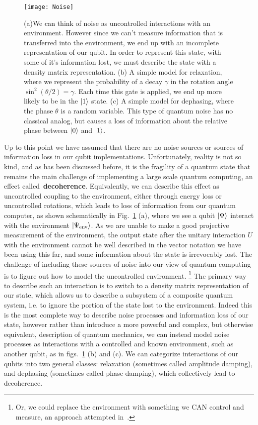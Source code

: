 \begin{figure}
  \texttt{[image: Noise]}
  \caption[Noise affecting pure states]
  {(a)We can think of noise as uncontrolled interactions with an environment. However since we can't measure
  information that is transferred into the environment, we end up with an incomplete representation of our qubit.
  In order to represent this state, with some of it's information lost, we must describe the state with a density
  matrix representation. (b) A simple model for relaxation, where we represent the probability of a decay $\gamma$
  in the rotation angle $\sin^2(\theta/2) = \gamma$. Each time this gate is applied, we end up more likely to be in
  the $\ket{1}$ state. (c) A simple model for dephasing, where the phase $\theta$ is a random variable. This type
  of quantum noise has no classical analog, but causes a loss of information about the relative phase between $\ket{0}$
  and $\ket{1}$.}
  \label{fig:noise}
\end{figure}

Up to this point we have assumed that there are no noise sources or sources of information loss in our
qubit implementations. Unfortunately, reality is not so kind, and as has been discussed before, it is the
fragility of a quantum state that remains the main challenge of implementing a large scale quantum computing,
an effect called~\textbf{decoherence}. Equivalently, we can describe this effect as uncontrolled coupling to the environment, either through
energy loss or uncontrolled rotations, which leads to loss of information from our quantum computer, as shown schematically
in Fig.~\ref{fig:noise} (a), where we see a qubit $\ket{\Psi}$ interact with the environment $\ket{\Psi_{\textrm{env}}}$.
As we are unable to make a good projective measurement of the environment, the output
state after the unitary interaction $U$ with the environment cannot be well described in the vector notation we have been using
this far, and some information about the state is irrevocably lost. The challenge of including
these sources of noise into our view of quantum computing is to figure out how to model the uncontrolled environment.
\footnote{Or, we could replace the environment with something we CAN control and measure, an approach attempted
in~\cite{2018arXiv180300545M}.}
The primary way to describe such an interaction is to switch to a density matrix representation of our state, which allows us
to describe a subsystem of a composite quantum system, i.e. to ignore the portion of the state lost to the environment.
Indeed this is the most complete way to describe noise processes and information loss of our state, however rather
than introduce a more powerful and complex, but otherwise equivalent, description of quantum mechanics, we can instead model
noise processes as interactions with a controlled and known environment, such as another qubit, as in figs.~\ref{fig:noise} (b) and (c).
We can categorize interactions of our qubits into two general classes: relaxation (sometimes called amplitude
damping), and dephasing (sometimes called phase damping), which collectively lead to decoherence.

